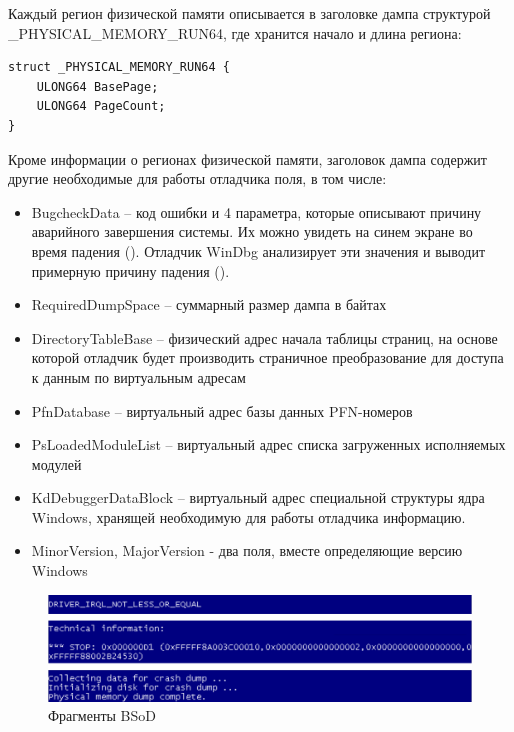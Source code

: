 \documentclass{mipt-thesis-bs}
\begin{document}
Каждый регион физической памяти описывается в заголовке дампа структурой {\_}PHYSICAL{\_}MEMORY{\_}RUN64, где хранится начало и длина региона:

\begin{verbatim}
struct _PHYSICAL_MEMORY_RUN64 {
    ULONG64 BasePage;
    ULONG64 PageCount;
}
\end{verbatim}

Кроме информации о регионах физической памяти, заголовок дампа содержит другие необходимые для работы отладчика поля, в том числе:

\begin{itemize}
        \item BugcheckData -- код ошибки и 4 параметра, которые описывают причину аварийного завершения системы. Их можно увидеть на синем экране во время падения (). Отладчик WinDbg анализирует эти значения и выводит примерную причину падения ().
    \item RequiredDumpSpace -- суммарный размер дампа в байтах
    \item DirectoryTableBase -- физический адрес начала таблицы страниц, на основе которой отладчик будет производить страничное преобразование для доступа к данным по виртуальным адресам
    \item PfnDatabase -- виртуальный адрес базы данных PFN-номеров\cite{winternals2}
    \item PsLoadedModuleList -- виртуальный адрес списка загруженных исполняемых модулей
    \item KdDebuggerDataBlock -- виртуальный адрес специальной структуры ядра Windows, хранящей необходимую для работы отладчика информацию.
    \item MinorVersion, MajorVersion - два поля, вместе определяющие версию Windows
\end{itemize}

\begin{figure}[h]
\begin{center}
    \includegraphics[width=1\textwidth]{dump.png}
    \caption{Фрагменты BSoD}
    \label{fig:bsod}
\end{center}
\end{figure}
\end{document}
